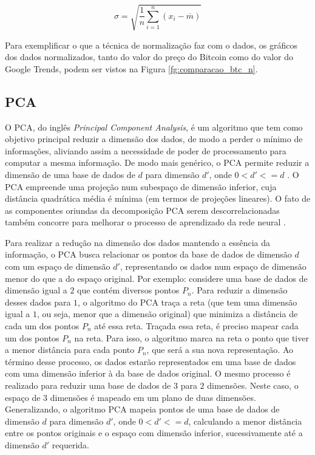 \begin{equation}
    \label{fun:desviopadrao}
 \sigma = \sqrt{ \frac{1}{n} \sum_{i=1}^{n}(x_i  - \overline{m})}
\end{equation}

Para exemplificar o que a técnica de normalização faz com o dados, os gráficos dos dados normalizados, tanto do valor do preço do Bitcoin como do valor do Google Trends, podem ser vistos na Figura \ref{fg:comparacao_btc_n}.

\subsection{PCA}


O PCA, do inglês \textit{Principal Component Analysis}, é um algoritmo que tem como objetivo principal reduzir a dimensão dos dados, de modo a perder o mínimo de informações, aliviando assim a necessidade de poder de processamento para computar a mesma informação. De modo mais genérico, o PCA permite reduzir a dimensão de uma base de dados de $d$ para dimensão $d'$, onde $0<d'<=d$ \cite{Jolliffe}. O PCA empreende uma projeção num subespaço de dimensão inferior, cuja distância quadrática média é mínima (em termos de projeções lineares). O fato de as componentes oriundas da decomposição PCA serem descorrelacionadas também concorre para melhorar o processo de aprendizado da rede neural \cite{wold1987principal, abdi2010principal, dunteman1989principal}.

Para realizar a redução na dimensão dos dados mantendo a essência da informação, o PCA busca relacionar os pontos da base de dados de dimensão $d$ com um espaço de dimensão $d'$, representando os dados num espaço de dimensão menor do que a do espaço original. Por exemplo: considere uma base de dados de dimensão igual a $2$ que contém diversos pontos $P_n$. Para reduzir a dimensão desses dados para $1$, o algoritmo do PCA traça a reta (que tem uma dimensão igual a $1$, ou seja, menor que a dimensão original) que minimiza a distância de cada um dos pontos $P_n$ até essa reta. Traçada essa reta, é preciso mapear cada um dos pontos $P_n$ na reta. Para isso, o algoritmo marca na reta o ponto que tiver a menor distância para cada ponto $P_n$, que será a sua nova representação. Ao término desse processo, os dados estarão representados em uma base de dados com uma dimensão inferior à da base de dados original. O mesmo processo é realizado para reduzir uma base de dados de $3$ para $2$ dimensões. Neste caso, o espaço de $3$ dimensões é mapeado em um plano de duas dimensões. Generalizando, o algoritmo PCA mapeia pontos de uma base de dados de dimensão $d$ para dimensão $d'$, onde $0<d'<=d$, calculando a menor distância entre os pontos originais e o espaço com dimensão inferior, sucessivamente até a dimensão $d'$ requerida. 

